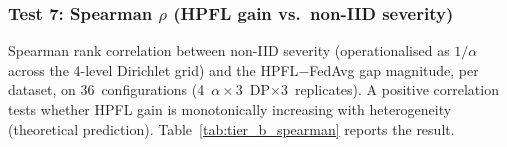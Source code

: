 \documentclass[conference]{IEEEtran}
\begin{document}
\begin{table}[htbp]
\centering
\caption{Mann-Whitney U for the federation gap comparisons. $n{=}5$ best-HPFL vs.\ $n{=}5$ baseline, two-sided. Cliff's $\delta$ also reported for completeness.}
\label{tab:tier_b_mwu}
\small
{}
\end{table}

\subsubsection*{Test 7: Spearman $\rho$ (HPFL gain vs.\ non-IID severity)}

Spearman rank correlation between non-IID severity (operationalised as $1/\alpha$ across the 4-level Dirichlet grid) and the HPFL$-$FedAvg gap magnitude, per dataset, on 36~configurations (4~$\alpha \times 3$~DP$\times$3~replicates). A positive correlation tests whether HPFL gain is monotonically increasing with heterogeneity (theoretical prediction). Table~\ref{tab:tier_b_spearman} reports the result.
\end{document}
